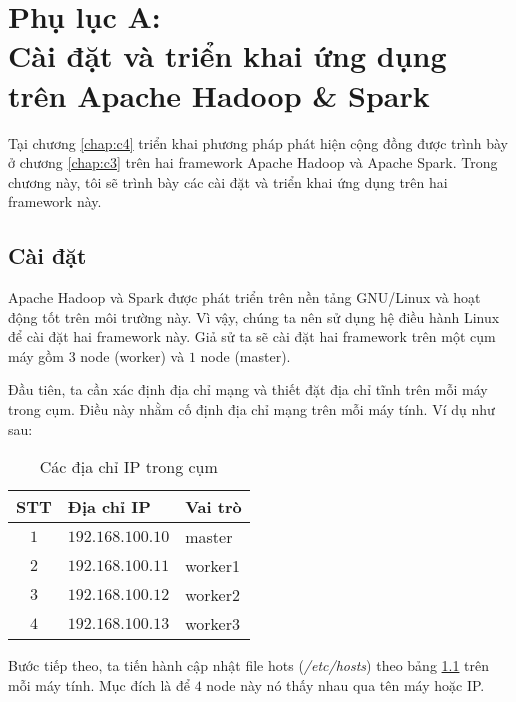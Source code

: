 \chapter{Phụ lục A:\\ Cài đặt và triển khai ứng dụng trên Apache Hadoop \& Spark}

Tại chương \ref{chap:c4} triển khai phương pháp phát hiện cộng đồng được trình bày ở chương \ref{chap:c3} trên hai framework Apache Hadoop và Apache Spark. Trong chương này, tôi sẽ trình bày các cài đặt và triển khai ứng dụng trên hai framework này.

\section{Cài đặt}
Apache Hadoop và Spark được phát triển trên nền tảng GNU/Linux và hoạt động tốt trên môi trường này. Vì vậy, chúng ta nên sử dụng hệ điều hành Linux để cài đặt hai framework này. Giả sử ta sẽ cài đặt hai framework trên một cụm máy gồm $3$ node (worker) và $1$ node (master).

Đầu tiên, ta cần xác định địa chỉ mạng và thiết đặt địa chỉ tĩnh trên mỗi máy trong cụm. Điều này nhằm cố định địa chỉ mạng trên mỗi máy tính. Ví dụ như sau:
\begin{table}[H]
	\centering
	\caption{Các địa chỉ IP trong cụm}
	\label{ipaddress}
	\begin{tabular}{@{}cll@{}}
		\toprule
		\multicolumn{1}{l}{\textbf{STT}} & \multicolumn{1}{l}{\textbf{Địa chỉ IP}} & \multicolumn{1}{l}{\textbf{Vai trò}} \\ \midrule
		$1$                                & $192.168.100.10$                  & master                               \\
		$2$                                & $192.168.100.11$                  & worker1                              \\
		$3$                               & $192.168.100.12$                  & worker2                              \\
		$4$                                & $192.168.100.13$                  & worker3                              \\ \bottomrule
	\end{tabular}
\end{table}

Bước tiếp theo, ta tiến hành cập nhật file hots (\textit{/etc/hosts}) theo bảng \ref{ipaddress} trên mỗi máy tính. Mục đích là để $4$ node này nó thấy nhau qua tên máy hoặc IP.

